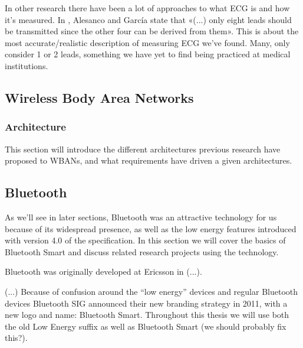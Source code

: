 In other research there have been a lot of approaches to what ECG is and how it's measured. In \cite{2010_Clinical_Assessment_of_Wireless_ECG_Transmission_in_Real-Time_Cardiac_Telemonitoring_15}, Alesanco and García state that «(...) only eight leads should be transmitted since the other four can be derived from them». This is about the most accurate/realistic description of measuring ECG we've found. Many, \cite{Artikler_med_1-2_leads_16} only consider 1 or 2 leads, something we have yet to find being practiced at medical institutions.


\subsection{Wireless Body Area Networks} %
\label{sub:wireless_body_area_networks}

\subsubsection{Architecture} %
\label{ssub:architecture}

This section will introduce the different architectures previous research have proposed to WBANs, and what requirements have driven a given architectures. 



\subsection{Bluetooth} %
\label{sub:bluetooth}

As we'll see in later sections, Bluetooth was an attractive technology for us because of its widespread presence, as well as the low energy features introduced with version 4.0 of the specification. In this section we will cover the basics of Bluetooth Smart and discuss related research projects using the technology.

Bluetooth was originally developed at Ericsson in (...). 

(...) Because of confusion around the ``low energy'' devices and regular Bluetooth devices Bluetooth SIG announced their new branding strategy in 2011, with a new logo and name: Bluetooth Smart. Throughout this thesis we will use both the old Low Energy suffix as well as Bluetooth Smart (we should probably fix this?).

